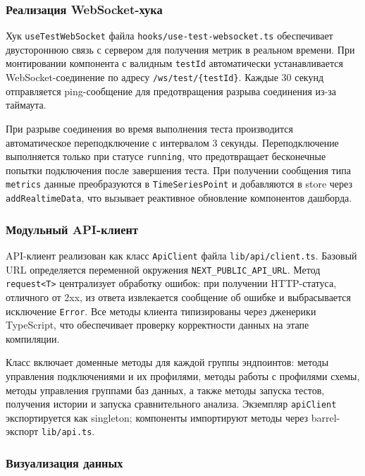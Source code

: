\subsubsection{Реализация WebSocket-хука}

Хук \texttt{useTestWebSocket} файла \texttt{hooks/use-test-websocket.ts} обеспечивает двустороннюю связь с сервером для получения метрик в реальном времени. При монтировании компонента с валидным \texttt{testId} автоматически устанавливается WebSocket-соединение по адресу \texttt{/ws/test/\{testId\}}. Каждые 30 секунд отправляется ping-сообщение для предотвращения разрыва соединения из-за таймаута.

При разрыве соединения во время выполнения теста производится автоматическое переподключение с интервалом 3 секунды. Переподключение выполняется только при статусе \texttt{running}, что предотвращает бесконечные попытки подключения после завершения теста. При получении сообщения типа \texttt{metrics} данные преобразуются в \texttt{TimeSeriesPoint} и добавляются в store через \texttt{addRealtimeData}, что вызывает реактивное обновление компонентов дашборда.

\subsubsection{Модульный API-клиент}

API-клиент реализован как класс \texttt{ApiClient} файла \texttt{lib/api/client.ts}. Базовый URL определяется переменной окружения \texttt{NEXT\_PUBLIC\_API\_URL}. Метод \texttt{request<T>} централизует обработку ошибок: при получении HTTP-статуса, отличного от 2xx, из ответа извлекается сообщение об ошибке и выбрасывается исключение \texttt{Error}. Все методы клиента типизированы через дженерики TypeScript, что обеспечивает проверку корректности данных на этапе компиляции.

Класс включает доменные методы для каждой группы эндпоинтов: методы управления подключениями и их профилями, методы работы с профилями схемы, методы управления группами баз данных, а также методы запуска тестов, получения истории и запуска сравнительного анализа. Экземпляр \texttt{apiClient} экспортируется как singleton; компоненты импортируют методы через barrel-экспорт \texttt{lib/api.ts}.

\subsubsection{Визуализация данных}

